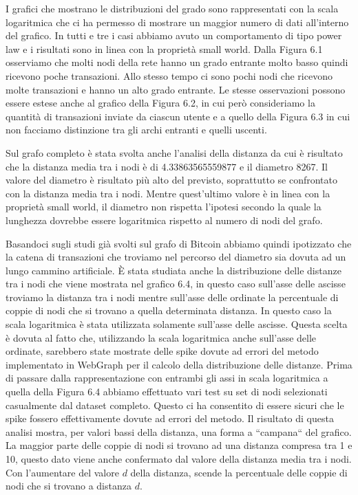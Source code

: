 \documentclass[12pt]{report}
\begin{document}
I grafici che mostrano le distribuzioni del grado sono rappresentati con la scala logaritmica che ci ha permesso di mostrare un maggior numero di dati all'interno del grafico.
\newline In tutti e tre i casi abbiamo avuto un comportamento di tipo power law e i risultati sono in linea con la proprietà small world.
Dalla Figura 6.1 osserviamo che molti nodi della rete hanno un grado entrante molto basso quindi ricevono poche transazioni. Allo stesso tempo ci sono pochi nodi che ricevono molte transazioni e hanno un alto grado entrante.
Le stesse osservazioni possono essere estese anche al grafico della Figura 6.2, in cui però consideriamo la quantità di transazioni inviate da ciascun utente e a quello della Figura 6.3 in cui non facciamo distinzione tra gli archi entranti e quelli uscenti.

Sul grafo completo è stata svolta anche l'analisi della distanza da cui è risultato che la distanza media tra i nodi è di 4.33863565559877 e il diametro 8267.
\newline
Il valore del diametro è risultato più alto del previsto, soprattutto se confrontato con la distanza media tra i nodi. Mentre quest'ultimo valore è in linea con la proprietà small world, il diametro non rispetta l'ipotesi secondo la quale la lunghezza dovrebbe essere logaritmica rispetto al numero di nodi del grafo.

Basandoci sugli studi già svolti sul grafo di Bitcoin \cite{maesa2017detecting} abbiamo quindi ipotizzato che la catena di transazioni che troviamo nel percorso del diametro sia dovuta ad un lungo cammino artificiale.
\newline
È stata studiata anche la distribuzione delle distanze tra i nodi che viene mostrata nel grafico 6.4, in questo caso sull'asse delle ascisse troviamo la distanza tra i nodi mentre sull'asse delle ordinate la percentuale di coppie di nodi che si trovano a quella determinata distanza.
In questo caso la scala logaritmica è stata utilizzata solamente sull'asse delle ascisse. 
Questa scelta è dovuta al fatto che, utilizzando la scala logaritmica anche sull'asse delle ordinate, sarebbero state mostrate delle spike dovute ad errori del metodo implementato in WebGraph per il calcolo della distribuzione delle distanze.
Prima di passare dalla rappresentazione con entrambi gli assi in scala logaritmica a quella della Figura 6.4 abbiamo effettuato vari test su set di nodi selezionati casualmente dal dataset completo. 
Questo ci ha consentito di essere sicuri che le spike fossero effettivamente dovute ad errori del metodo.
Il risultato di questa analisi mostra, per valori bassi della distanza, una forma a ``campana`` del grafico. La maggior parte delle coppie di nodi si trovano ad una distanza compresa tra 1 e 10, questo dato viene anche confermato dal valore della distanza media tra i nodi. 
Con l'aumentare del valore $d$ della distanza, scende la percentuale delle coppie di nodi che si trovano a distanza $d$.
\end{document}
